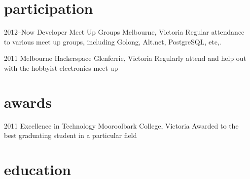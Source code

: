 \documentclass[]{friggeri-cv} %
\begin{document}


\section{participation}

\begin{entrylist}

\entry
{2012--Now}
{Developer Meet Up Groups}
{Melbourne, Victoria}
{Regular attendance to various meet up groups, including Golong, Alt.net,
PostgreSQL, etc,.}

\entry
{2011}
{Melbourne Hackerspace}
{Glenferrie, Victoria}
{Regularly attend and help out with the hobbyist electronics meet up}
\end{entrylist}

\section{awards}

\begin{entrylist}
\entry
{2011}
{Excellence in Technology}
{Mooroolbark College, Victoria}
{Awarded to the best graduating student in a particular field}
\end{entrylist}

\pagebreak

\section{education}
\end{document}
